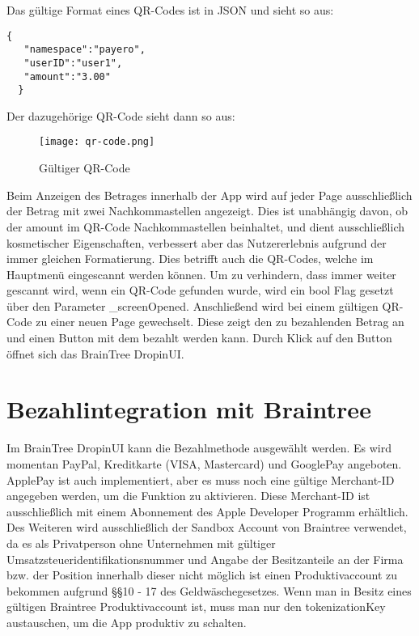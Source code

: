 Das gültige Format eines QR-Codes ist in JSON und sieht so aus:

\begin{lstlisting}[caption={Gültiger QR-Code}]
  {
   "namespace":"payero",
   "userID":"user1",
   "amount":"3.00"
  }
\end{lstlisting}

Der dazugehörige QR-Code sieht dann so aus:

\begin{figure}[H]
  \centering
  \texttt{[image: qr-code.png]}
  \caption{Gültiger QR-Code}
\end{figure}

Beim Anzeigen des Betrages innerhalb der App wird auf jeder Page ausschließlich der Betrag mit zwei Nachkommastellen angezeigt.
Dies ist unabhängig davon, ob der \glqq amount\grqq{} im QR-Code Nachkommastellen beinhaltet, und dient ausschließlich kosmetischer Eigenschaften, verbessert aber das Nutzererlebnis aufgrund der immer gleichen Formatierung.
Dies betrifft auch die QR-Codes, welche im Hauptmenü eingescannt werden können.
Um zu verhindern, dass immer weiter gescannt wird, wenn ein QR-Code gefunden wurde, wird ein bool Flag gesetzt über den Parameter \glqq \_screenOpened\grqq{}.
Anschließend wird bei einem gültigen QR-Code zu einer neuen Page gewechselt.
Diese zeigt den zu bezahlenden Betrag an und einen Button mit dem bezahlt werden kann.
Durch Klick auf den Button öffnet sich das BrainTree DropinUI.

\section{Bezahlintegration mit Braintree}

Im BrainTree DropinUI kann die Bezahlmethode ausgewählt werden.
Es wird momentan PayPal, Kreditkarte (VISA, Mastercard) und GooglePay angeboten.
ApplePay ist auch implementiert, aber es muss noch eine gültige Merchant-ID angegeben werden, um die Funktion zu aktivieren.
Diese Merchant-ID ist ausschließlich mit einem Abonnement des Apple Developer Programm erhältlich.
Des Weiteren wird ausschließlich der Sandbox Account von Braintree verwendet, da es als Privatperson ohne Unternehmen mit gültiger Umsatzsteueridentifikationsnummer und Angabe der Besitzanteile an der Firma bzw. der Position innerhalb dieser nicht möglich ist einen Produktivaccount zu bekommen aufgrund \S\S 10 - 17 des Geldwäschegesetzes.
Wenn man in Besitz eines gültigen Braintree Produktivaccount ist, muss man nur den \glqq tokenizationKey\grqq{} austauschen, um die App produktiv zu schalten.

